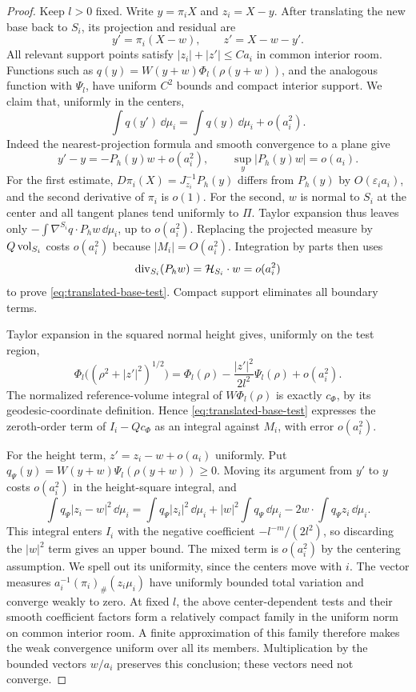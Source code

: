 \begin{proof}
Keep $l>0$ fixed. Write $y=\pi_iX$ and $z_i=X-y$. After translating
the new base back to $S_i$, its projection and residual are
\[
                   y'=\pi_i(X-w),\qquad z'=X-w-y'.
\]
All relevant support points satisfy $|z_i|+|z'|\le Ca_i$ in common
interior room. Functions such as
$q(y)=W(y+w)\Phi_l(\rho(y+w))$, and the analogous function with
$\Psi_l$, have uniform $C^2$ bounds and compact interior support.
We claim that, uniformly in the centers,
\begin{equation}\label{eq:translated-base-test}
             \int q(y')\,\dd\mu_i
               =\int q(y)\,\dd\mu_i+o(a_i^2).
\end{equation}
Indeed the nearest-projection formula and smooth convergence to a plane
give
\[
 y'-y=-P_h(y)w+o(a_i^2),\qquad
                  \sup_y|P_h(y)w|=o(a_i).
\]
For the first estimate, $D\pi_i(X)=J_{z_i}^{-1}P_h(y)$ differs from
$P_h(y)$ by $O(\varepsilon_i a_i)$, and the second derivative of
$\pi_i$ is $o(1)$. For the second, $w$ is normal to $S_i$ at the
center and all tangent planes tend uniformly to $\Pi$.
Taylor expansion thus leaves only
$-\int\nabla^{S_i}q\cdot P_hw\,\dd\mu_i$, up to $o(a_i^2)$.
Replacing the projected measure by $Q\operatorname{vol}_{S_i}$ costs $o(a_i^2)$
because $|M_i|=O(a_i^2)$. Integration by parts then uses
\[
             \operatorname{div}_{S_i}(P_hw)=\mathcal H_{S_i}\cdot w=o(a_i^2)
\]
to prove \eqref{eq:translated-base-test}. Compact support eliminates
all boundary terms.

Taylor expansion in the squared normal height gives, uniformly on the
test region,
\[
 \Phi_l\bigl((\rho^2+|z'|^2)^{1/2}\bigr)
 =\Phi_l(\rho)-\frac{|z'|^2}{2l^2}\Psi_l(\rho)+o(a_i^2).
\]
The normalized reference-volume integral of $W\Phi_l(\rho)$ is
exactly $c_\Phi$, by its geodesic-coordinate definition. Hence
\eqref{eq:translated-base-test} expresses the zeroth-order term of
$I_i-Qc_\Phi$ as an integral against $M_i$, with error $o(a_i^2)$.

For the height term, $z'=z_i-w+o(a_i)$ uniformly. Put
$q_\Psi(y)=W(y+w)\Psi_l(\rho(y+w))\ge0$. Moving its argument
from $y'$ to $y$ costs $o(a_i^2)$ in the height-square integral,
and
\[
 \int q_\Psi|z_i-w|^2\,\dd\mu_i
 =\int q_\Psi|z_i|^2\,\dd\mu_i
   +|w|^2\int q_\Psi\,\dd\mu_i
   -2w\cdot\int q_\Psi z_i\,\dd\mu_i.
\]
This integral enters $I_i$ with the negative coefficient
$-l^{-m}/(2l^2)$, so discarding the $|w|^2$ term gives an upper
bound. The mixed term is $o(a_i^2)$ by the centering assumption.
We spell out its uniformity, since the centers move with $i$.
The vector measures
$a_i^{-1}(\pi_i)_\#(z_i\mu_i)$ have uniformly bounded total variation
and converge weakly to zero. At fixed $l$, the above center-dependent
tests and their smooth coefficient factors form a relatively compact
family in the uniform norm on common interior room. A finite
approximation of this family therefore makes the weak convergence
uniform over all its members. Multiplication by the bounded vectors
$w/a_i$ preserves this conclusion; these vectors need not converge.


\end{proof}
